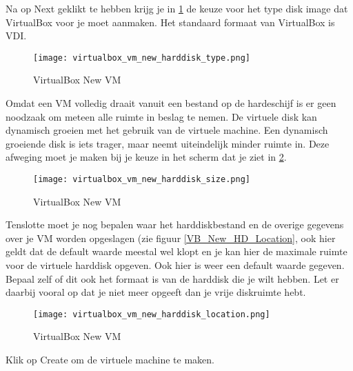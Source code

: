 Na op Next geklikt te hebben krijg je in \ref{VB_New_VM_HD_Type} de keuze voor het type disk image dat VirtualBox voor je moet aanmaken. Het standaard formaat van VirtualBox is VDI.

\begin{figure}[H]
	\centering
	\texttt{[image: virtualbox\_vm\_new\_harddisk\_type.png]}
	\caption{VirtualBox New VM}
	\label{VB_New_VM_HD_Type}
\end{figure}

Omdat een VM volledig draait vanuit een bestand op de hardeschijf is er geen noodzaak om meteen alle ruimte in beslag te nemen. De virtuele disk kan dynamisch groeien met het gebruik van de virtuele machine. Een dynamisch groeiende disk is iets trager, maar neemt uiteindelijk minder ruimte in. Deze afweging moet je maken bij je keuze in het scherm dat je ziet in \ref{VB_New_VM_HD_Size}.

\begin{figure}[H]
	\centering
	\texttt{[image: virtualbox\_vm\_new\_harddisk\_size.png]}
	\caption{VirtualBox New VM}
	\label{VB_New_VM_HD_Size}
\end{figure}

Tenslotte moet je nog bepalen waar het harddiskbestand en de overige gegevens over je VM worden opgeslagen (zie figuur \ref{VB_New_HD_Location}, ook hier geldt dat de default waarde meestal wel klopt en je kan hier de maximale ruimte voor de virtuele harddisk opgeven. Ook hier is weer een default waarde gegeven. Bepaal zelf of dit ook het formaat is van de harddisk die je wilt hebben. Let er daarbij vooral op dat je niet meer opgeeft dan je vrije diskruimte hebt.

\begin{figure}[H]
	\centering
	\texttt{[image: virtualbox\_vm\_new\_harddisk\_location.png]}
	\caption{VirtualBox New VM}
	\label{VB_New_VM_HD_Location}
\end{figure}

Klik op Create om de virtuele machine te maken.
